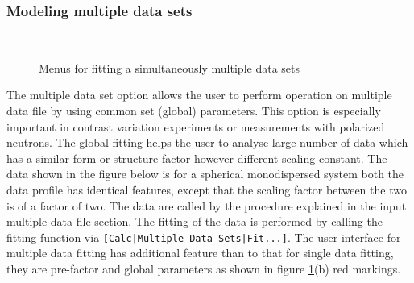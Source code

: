 \subsubsection{Modeling multiple data sets}~\\
\begin{figure}[htb]
\centering
\caption{Menus for fitting a simultaneously multiple data sets}
\label{fig:QTmultiplefit}
\end{figure}
The multiple data set option allows the user to perform operation on
multiple data file by using common set (global) parameters. This
option is especially important in contrast variation experiments or
measurements with polarized neutrons. The global fitting helps the
user to analyse large number of data which has a similar form or
structure factor however different scaling constant. The data shown
in the figure below is for a spherical monodispersed system both the
data profile has identical features, except that the scaling factor
between the two is of a factor of two. The data are called by the
procedure explained in the input multiple data file section. The
fitting of the data is performed by calling the fitting function via
\verb"[Calc|Multiple Data Sets|Fit...]". The user interface for multiple
data fitting has additional feature than to that for single data
fitting, they are pre-factor and global parameters as shown in
figure \ref{fig:QTmultiplefit}(b) red markings.


